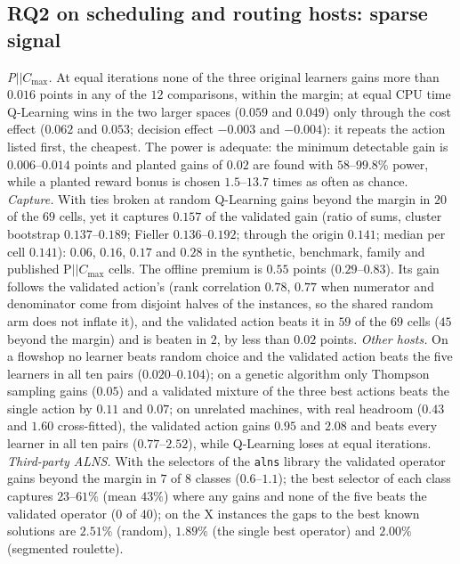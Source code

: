 \documentclass[conference,a4paper]{IEEEtran}
\newcommand{\Cmax}{C_{\max}}
\begin{document}
\subsection{RQ2 on scheduling and routing hosts: sparse signal}
\label{sec:rq2}
\emph{P$||\Cmax$.} At equal iterations none of the three original learners gains more than $0.016$ points in any of the $12$ comparisons, within the margin; at equal CPU time Q-Learning wins in the two larger spaces ($0.059$ and $0.049$) only through the cost effect ($0.062$ and $0.053$; decision effect $-0.003$ and $-0.004$): it repeats the action listed first, the cheapest.
The power is adequate: the minimum detectable gain is $0.006$--$0.014$ points and planted gains of $0.02$ are found with $58$--$99.8\%$ power, while a planted reward bonus is chosen $1.5$--$13.7$ times as often as chance.
\emph{Capture.} With ties broken at random Q-Learning gains beyond the margin in $20$ of the $69$ cells, yet it captures $0.157$ of the validated gain (ratio of sums, cluster bootstrap $0.137$--$0.189$; Fieller $0.136$--$0.192$; through the origin $0.141$; median per cell $0.141$): $0.06$, $0.16$, $0.17$ and $0.28$ in the synthetic, benchmark, family and published P$||\Cmax$ cells.
The offline premium is $0.55$ points ($0.29$--$0.83$). Its gain follows the validated action's (rank correlation $0.78$, $0.77$ when numerator and denominator come from disjoint halves of the instances, so the shared random arm does not inflate it), and the validated action beats it in $59$ of the $69$ cells ($45$ beyond the margin) and is beaten in $2$, by less than $0.02$ points.
\emph{Other hosts.} On a flowshop no learner beats random choice and the validated action beats the five learners in all ten pairs ($0.020$--$0.104$); on a genetic algorithm only Thompson sampling gains ($0.05$) and a validated mixture of the three best actions beats the single action by $0.11$ and $0.07$; on unrelated machines, with real headroom ($0.43$ and $1.60$ cross-fitted), the validated action gains $0.95$ and $2.08$ and beats every learner in all ten pairs ($0.77$--$2.52$), while Q-Learning loses at equal iterations.
\emph{Third-party ALNS.} With the selectors of the \texttt{alns} library the validated operator gains beyond the margin in $7$ of $8$ classes ($0.6$--$1.1$); the best selector of each class captures $23$--$61\%$ (mean $43\%$) where any gains and none of the five beats the validated operator ($0$ of $40$); on the X instances the gaps to the best known solutions are $2.51\%$ (random), $1.89\%$ (the single best operator) and $2.00\%$ (segmented roulette).
\end{document}
